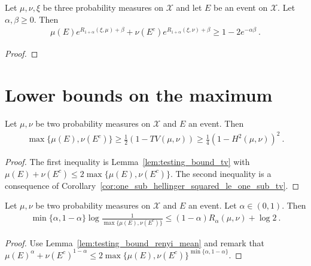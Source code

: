 \begin{lemma}
  \label{lem:renyi_change_measure_add}
  Let $\mu, \nu, \xi$ be three probability measures on $\mathcal X$ and let $E$ be an event on $\mathcal X$. Let $\alpha, \beta \ge 0$. Then
  \begin{align*}
  \mu(E) e^{R_{1+\alpha}(\xi, \mu) + \beta} + \nu(E^c) e^{R_{1+\alpha}(\xi, \nu) + \beta} \ge 1 - 2 e^{-\alpha \beta} \: .
  \end{align*}
\end{lemma}

\begin{proof}
\end{proof}


\section{Lower bounds on the maximum}

\begin{lemma}
  \label{lem:testing_bound_tv_hellinger_max}
  Let $\mu, \nu$ be two probability measures on $\mathcal X$ and $E$ an event. Then
  \begin{align*}
  \max\{\mu(E), \nu(E^c)\}
  \ge \frac{1}{2}(1 - TV(\mu, \nu))
  \ge \frac{1}{4}(1 - H^2(\mu, \nu))^2
  \: .
  \end{align*}
\end{lemma}

\begin{proof}
The first inequality is Lemma~\ref{lem:testing_bound_tv} with $\mu(E) + \nu(E^c) \le 2 \max\{\mu(E), \nu(E^c)\}$.
The second inequality is a consequence of Corollary~\ref{cor:one_sub_hellinger_squared_le_one_sub_tv}.
\end{proof}

\begin{lemma}
  \label{lem:testing_bound_renyi_max}
  Let $\mu, \nu$ be two probability measures on $\mathcal X$ and $E$ an event. Let $\alpha \in (0,1)$. Then
  \begin{align*}
  \min\{\alpha, 1 - \alpha\} \log\frac{1}{\max\{\mu(E), \nu(E^c)\}} \le (1 - \alpha) R_{\alpha}(\mu, \nu)  + \log 2 \: .
  \end{align*}
\end{lemma}

\begin{proof}
Use Lemma~\ref{lem:testing_bound_renyi_mean} and remark that $\mu(E)^\alpha + \nu(E^c)^{1 - \alpha} \le 2\max\{\mu(E), \nu(E^c)\}^{\min\{\alpha, 1 - \alpha\}}$.
\end{proof}


